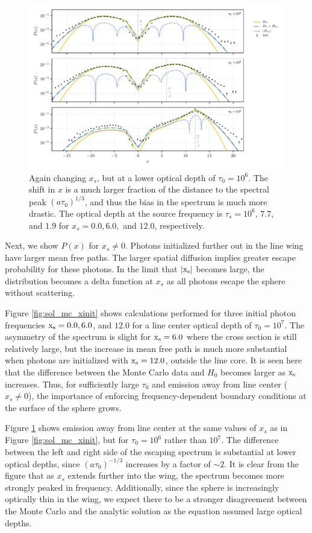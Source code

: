 \documentclass{aastex63}
\begin{document}
 \begin{figure}
    \centering
    \includegraphics{xinit_threepanel_tau1e6.pdf}
    \caption{Again changing $x_s$, but at a lower optical depth of $\tau_0 = 10^6$. The shift in $x$ is a much larger fraction of the distance to the spectral peak $(a\tau_0)^{1/3}$, and thus the bias in the spectrum is much more drastic. The optical depth at the source frequency is $\tau_s = 10^6$, $7.7$, and $1.9$ for $x_s=0.0, 6.0,$ and $12.0$, respectively. } 
    \label{fig:sol_mc_xinit_lowtau}
\end{figure}

Next, we show $P(x)$ for $x_s \neq 0$. Photons initialized further out in the line wing have larger mean free paths. The larger spatial diffusion implies greater escape probability for these photons. In the limit that $|\rm x_s|$ becomes large, the distribution becomes a delta function at $x_s$ as all photons escape the sphere without scattering. 

Figure \ref{fig:sol_mc_xinit} shows calculations performed for three initial photon frequencies $\rm x_s = 0.0, 6.0$, and $12.0$ for a line center optical depth of $\tau_0=10^7$. The asymmetry of the spectrum is slight for $\rm x_s = 6.0$ where the cross section is still relatively large, but the increase in mean free path is much more substantial when photons are initialized with $\rm x_s=12.0$, outside the line core. It is seen here that the difference between the Monte Carlo data and $H_0$ becomes larger as $\rm x_s$ increases. Thus, for sufficiently large $\tau_0$ and emission away from line center ($x_s \neq 0$), the importance of enforcing frequency-dependent boundary conditions at the surface of the sphere grows. 

Figure \ref{fig:sol_mc_xinit_lowtau} shows emission away from line center at the same values of $x_s$ as in Figure \ref{fig:sol_mc_xinit}, but for $\tau_0=10^6$ rather than $10^7$. The difference between the left and right side of the escaping spectrum is substantial at lower optical depths, since $(a\tau_0)^{-1/3}$ increases by a factor of ${\sim}2$. It is clear from the figure that as $x_s$ extends further into the wing, the spectrum becomes more strongly peaked in frequency. Additionally, since the sphere is increasingly optically thin in the wing, we expect there to be a stronger disagreement between the Monte Carlo and the analytic solution as the equation assumed large optical depths.
\end{document}
